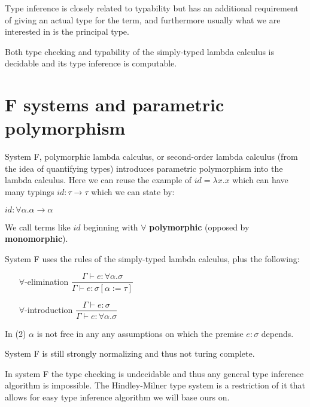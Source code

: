 Type inference is closely related to typability but has an additional requirement of giving an actual type for the term, and furthermore
usually what we are interested in is the principal type.

Both type checking and typability of the simply-typed lambda calculus is decidable and its type inference is computable. %

\section{F systems and parametric polymorphism} %

System F, polymorphic lambda calculus, or second-order lambda calculus (from the idea of quantifying types) introduces
parametric polymorphism into the lambda calculus. Here we can reuse the example of $id = \lambda x . x$ which can have many typings
$id : \tau \rightarrow \tau$ which we can state by:

$id : \forall \alpha . \alpha \rightarrow \alpha$

We call terms like $id$ beginning with $\forall$ \textbf{polymorphic} (opposed by \textbf{monomorphic}).

System F uses the rules of the simply-typed lambda calculus, plus the following:

\begin{itemize}
    \item[$\forall$-elimination] $\dfrac{\Gamma \vdash e : \forall \alpha . \sigma}{\Gamma \vdash e : \sigma [\alpha := \tau]}$
    \item[$\forall$-introduction] $\dfrac{\Gamma \vdash e : \sigma}{\Gamma \vdash e : \forall \alpha . \sigma}$
\end{itemize}

In (2) $\alpha$ is not free in any any assumptions on which the premise $e : \sigma$ depends. %

System F is still strongly normalizing and thus not turing complete. %

In system F the type checking is undecidable and thus any general type inference algorithm is impossible.
The Hindley-Milner type system is a restriction of it %
that allows for easy type inference algorithm we will base ours on.

